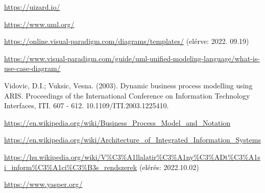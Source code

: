 \documentclass[12pt]{article}
\begin{document}
\begin{thebibliography}{99}
\url{https://uizard.io/}

 \url{https://www.uml.org/}

\url{https://online.visual-paradigm.com/diagrams/templates/} (elérve: 2022. 09.19)

\url{https://www.visual-paradigm.com/guide/uml-unified-modeling-language/what-is-use-case-diagram/}

Vidovic, D.I.; Vuksic, Vesna. (2003). Dynamic business process modelling using ARIS. Proceedings of the International Conference on Information Technology Interfaces, ITI. 607 - 612. 10.1109/ITI.2003.1225410. 

\url{https://en.wikipedia.org/wiki/Business_Process_Model_and_Notation}

\url{https://en.wikipedia.org/wiki/Architecture_of_Integrated_Information_Systems}

\url{https://hu.wikipedia.org/wiki/V%C3%A1llalatir%C3%A1ny%C3%ADt%C3%A1si_inform%C3%A1ci%C3%B3s_rendszerek} (elérés: 2022.10.02)

\url{https://www.yasper.org/}
\end{thebibliography}
\end{document}
